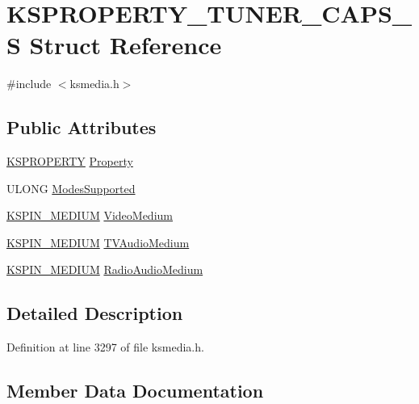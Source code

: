 \hypertarget{struct_k_s_p_r_o_p_e_r_t_y___t_u_n_e_r___c_a_p_s___s}{}\section{K\+S\+P\+R\+O\+P\+E\+R\+T\+Y\+\_\+\+T\+U\+N\+E\+R\+\_\+\+C\+A\+P\+S\+\_\+S Struct Reference}
\label{struct_k_s_p_r_o_p_e_r_t_y___t_u_n_e_r___c_a_p_s___s}


{\ttfamily \#include $<$ksmedia.\+h$>$}

\subsection*{Public Attributes}
\begin{DoxyCompactItemize}
\item 
\hyperlink{ks_8h_a4392f77c74e868d813d46c39ada4d660}{K\+S\+P\+R\+O\+P\+E\+R\+TY} \hyperlink{struct_k_s_p_r_o_p_e_r_t_y___t_u_n_e_r___c_a_p_s___s_a58b90a729413b011ba1b1400e68bb593}{Property}
\item 
U\+L\+O\+NG \hyperlink{struct_k_s_p_r_o_p_e_r_t_y___t_u_n_e_r___c_a_p_s___s_a915de943958c3543844f91eaa7e860c1}{Modes\+Supported}
\item 
\hyperlink{ks_8h_a1e8ded652cd6544c903137c8e662d69f}{K\+S\+P\+I\+N\+\_\+\+M\+E\+D\+I\+UM} \hyperlink{struct_k_s_p_r_o_p_e_r_t_y___t_u_n_e_r___c_a_p_s___s_a8af71eca0c8cf663f772c10782f0de54}{Video\+Medium}
\item 
\hyperlink{ks_8h_a1e8ded652cd6544c903137c8e662d69f}{K\+S\+P\+I\+N\+\_\+\+M\+E\+D\+I\+UM} \hyperlink{struct_k_s_p_r_o_p_e_r_t_y___t_u_n_e_r___c_a_p_s___s_a491253242a94daaeeed66e3168630b02}{T\+V\+Audio\+Medium}
\item 
\hyperlink{ks_8h_a1e8ded652cd6544c903137c8e662d69f}{K\+S\+P\+I\+N\+\_\+\+M\+E\+D\+I\+UM} \hyperlink{struct_k_s_p_r_o_p_e_r_t_y___t_u_n_e_r___c_a_p_s___s_a7d82500fa94f509ab8c30c4f78676eb4}{Radio\+Audio\+Medium}
\end{DoxyCompactItemize}


\subsection{Detailed Description}


Definition at line 3297 of file ksmedia.\+h.



\subsection{Member Data Documentation}
